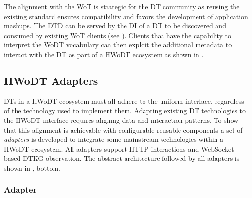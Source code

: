 



The alignment with the \ac{WoT} is strategic for the \ac{DT} community as reusing the existing standard ensures compatibility and favors the development of application mashups.
%
The \ac{DTD} can be served by the \ac{DI} of a \ac{DT} to be discovered and consumed by existing \ac{WoT} clients (see ).
%
Clients that have the capability to interpret the \ac{WoDT} vocabulary can then exploit the additional metadata to interact with the \ac{DT} as part of a \ac{HWoDT} ecosystem as shown in .

\subsection{HWoDT Adapters}
\label{ssec:adapters}

\acp{DT} in a \ac{HWoDT} ecosystem must all adhere to the uniform interface, regardless of the technology used to implement them.
%
Adapting existing \ac{DT} technologies to the \ac{HWoDT} interface requires aligning data and interaction patterns.
%
To show that this alignment is achievable with configurable reusable components a set of \emph{adapters} is developed to integrate some mainstream technologies within a \ac{HWoDT} ecosystem.
%
All adapters support HTTP interactions and WebSocket-based \ac{DTKG} observation.
%
The abstract architecture followed by all adapters is shown in , bottom.

\subsubsection{\azureTwin{} Adapter}

